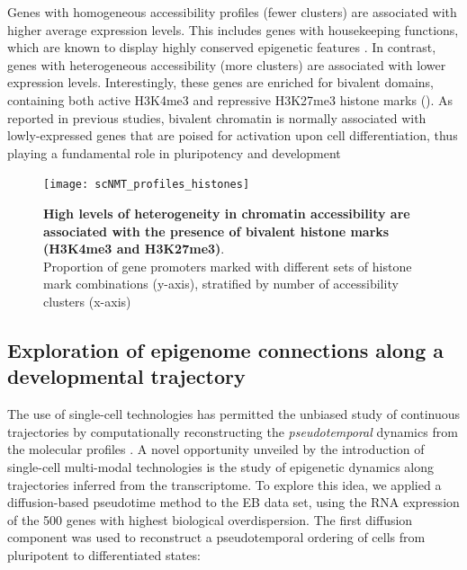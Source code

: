 Genes with homogeneous accessibility profiles (fewer clusters) are associated with higher average expression levels. This includes genes with housekeeping functions, which are known to display highly conserved epigenetic features \cite{She2009}. In contrast, genes with heterogeneous accessibility (more clusters) are associated with lower expression levels. Interestingly, these genes are enriched for bivalent domains, containing both active H3K4me3 and repressive H3K27me3 histone marks (). As reported in previous studies, bivalent chromatin is normally associated with lowly-expressed genes that are poised for activation upon cell differentiation, thus playing a fundamental role in pluripotency and development \cite{Vastenhouw2012,Bernstein2006}

\begin{figure}[H]
	\centering
	\texttt{[image: scNMT\_profiles\_histones]}
	\caption[]{\textbf{High levels of heterogeneity in chromatin accessibility are associated with the presence of bivalent histone marks (H3K4me3 and H3K27me3)}.\\
	Proportion of gene promoters marked with different sets of histone mark combinations (y-axis), stratified by number of accessibility clusters (x-axis)
	}
	\label{fig:scnmt_profiles_histones}
\end{figure}


\subsection{Exploration of epigenome connections along a developmental trajectory}

The use of single-cell technologies has permitted the unbiased study of continuous trajectories by computationally reconstructing the \textit{pseudotemporal} dynamics from the molecular profiles \cite{Trapnell2014,Haghverdi2016,Saelens2018}. A novel opportunity unveiled by the introduction of single-cell multi-modal technologies is the study of epigenetic dynamics along trajectories inferred from the transcriptome. To explore this idea, we applied a diffusion-based pseudotime method\cite{Haghverdi2016} to the EB data set, using the RNA expression of the 500 genes with highest biological overdispersion\cite{Lun2016}. The first diffusion component was used to reconstruct a pseudotemporal ordering of cells from pluripotent to differentiated states:

